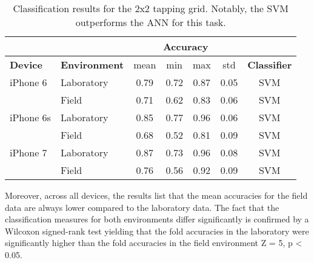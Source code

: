\begin{table}[h!]
  \centering
  \begin{tabular}{|l|l|c|c|c|c|c|}
    \cline{3-6}
    \multicolumn{2}{c}{} & \multicolumn{4}{|c|}{\textbf{Accuracy}}  \\
    \hline
    \textbf{Device} & \textbf{Environment} & mean &   min &   max  & std &  \textbf{Classifier} \\
    \hline
    iPhone 6 & Laboratory &      0.79 &     0.72 &     0.87 &     0.05 &  SVM \\
    & Field &      0.71 &     0.62 &     0.83 &     0.06 &  SVM \\
    \hline
iPhone 6s     & Laboratory &      0.85 &     0.77 &     0.96 &     0.06 &  SVM \\
& Field &      0.68 &     0.52 &     0.81 &     0.09 &  SVM \\
    \hline
iPhone 7 & Laboratory &      0.87 &     0.73 &     0.96 &     0.08 &  SVM \\
& Field &      0.76 &     0.56 &     0.92 &     0.09 &  SVM \\
    \hline
  \end{tabular}
  \caption{Classification results for the 2x2 tapping grid. Notably, the SVM outperforms the ANN for this task.}
\end{table}



Moreover, across all devices, the results list that the mean accuracies for the field data are always lower compared to the laboratory data. The fact that the classification measures for both environments differ significantly is confirmed by a Wilcoxon signed-rank test yielding that the fold accuracies in the laboratory were significantly higher than the fold accuracies in the field environment Z = 5, p < 0.05.

